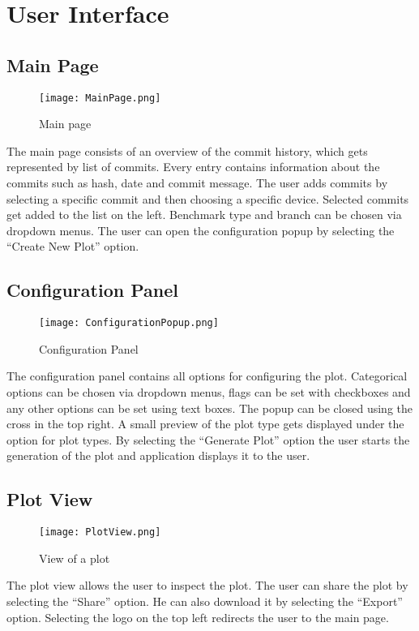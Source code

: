 \section{User Interface}

\subsection{Main Page}

\begin{figure}[H]
    \texttt{[image: MainPage.png]}
    \caption{Main page}
    \label{ui:main}
\end{figure}

The main page consists of an overview of the commit history, which gets represented by list of commits. Every entry contains information about the commits such as hash, date and commit message. The user adds commits by selecting a specific commit and then choosing a specific device. Selected commits get added to the list on the left. Benchmark type and branch can be chosen via dropdown menus. The user can open the configuration popup by selecting the \enquote{Create New Plot} option.

\subsection{Configuration Panel}

\begin{figure}[H]
    \texttt{[image: ConfigurationPopup.png]}
    \caption{Configuration Panel}
    \label{ui:config}
\end{figure}

The configuration panel contains all options for configuring the \gls{plot}. Categorical options can be chosen via dropdown menus, flags can be set with checkboxes and any other options can be set using text boxes. The popup can be closed using the cross in the top right. A small preview of the \gls{plot} type gets displayed under the option for \glspl{plot type}. By selecting the \enquote{Generate Plot} option the user starts the generation of the \gls{plot} and application displays it to the user.

\subsection{Plot View}

\begin{figure}[H]
    \texttt{[image: PlotView.png]}
    \caption{View of a \gls{plot}}
    \label{ui:plot}
\end{figure}

The plot view allows the user to inspect the \gls{plot}. The user can share the \gls{plot} by selecting the \enquote{Share} option. He can also download it by selecting the \enquote{Export} option. Selecting the logo on the top left redirects the user to the main page.
